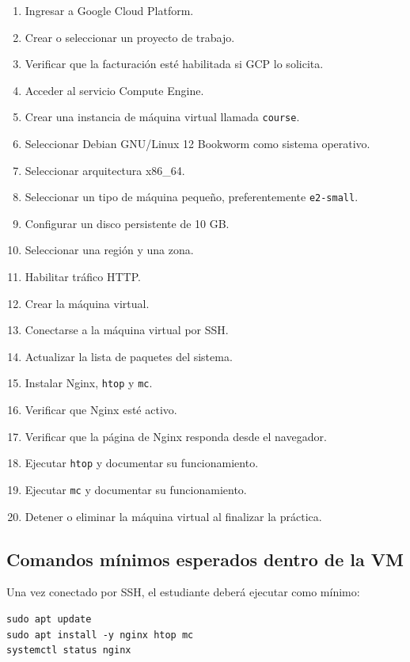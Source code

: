 \documentclass[
  coursetitle={Cómputo Nube y Tecnologías Emergentes},
  coursehours={96},
  coursedate={Verano 2026},
  doctype={Tarea 2},
  otherlangs={english,french},
  authorname={Lázaro},
  authorsurname={Bustio-Martínez},
  authortitle={PhD},
  role={Profesor Investigador},
  email={lbustio@inaoe.mx},
  phone={5559504000},
  ext={7459},
  institution={Instituto Nacional de Astrofísica, Óptica y Electrónica (INAOE)},
  department={Maestría en Ciencias en Tecnologías de Seguridad},
  address={Luis Enrique Erro 1, Sta. Ma. Tonantzintla, San Andrés Cholula, CP 72840, Puebla, México},
  margin={0.5in}
]{../../../lbustio_lecture_notes}
\begin{document}
\begin{enumerate}
  \item Ingresar a Google Cloud Platform.
  \item Crear o seleccionar un proyecto de trabajo.
  \item Verificar que la facturación esté habilitada si GCP lo solicita.
  \item Acceder al servicio Compute Engine.
  \item Crear una instancia de máquina virtual llamada \texttt{course}.
  \item Seleccionar Debian GNU/Linux 12 Bookworm como sistema operativo.
  \item Seleccionar arquitectura x86\_64.
  \item Seleccionar un tipo de máquina pequeño, preferentemente \texttt{e2-small}.
  \item Configurar un disco persistente de 10 GB.
  \item Seleccionar una región y una zona.
  \item Habilitar tráfico HTTP.
  \item Crear la máquina virtual.
  \item Conectarse a la máquina virtual por SSH.
  \item Actualizar la lista de paquetes del sistema.
  \item Instalar Nginx, \texttt{htop} y \texttt{mc}.
  \item Verificar que Nginx esté activo.
  \item Verificar que la página de Nginx responda desde el navegador.
  \item Ejecutar \texttt{htop} y documentar su funcionamiento.
  \item Ejecutar \texttt{mc} y documentar su funcionamiento.
  \item Detener o eliminar la máquina virtual al finalizar la práctica.
\end{enumerate}

\subsection{Comandos mínimos esperados dentro de la VM}
\label{sec:tarea2-comandos}

Una vez conectado por SSH, el estudiante deberá ejecutar como mínimo:

\begin{verbatim}
sudo apt update
sudo apt install -y nginx htop mc
systemctl status nginx
\end{verbatim}
\end{document}
